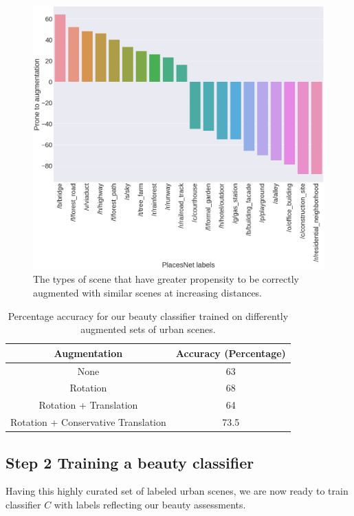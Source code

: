 \begin{figure}[t!]
    \centering
    \includegraphics[width=\columnwidth]{SimilarityPlacesPrevalence.png}
    \caption{The types of scene that have greater propensity to be correctly augmented with similar scenes at increasing distances.}
    \label{fig:augmentationSimilarity}
\end{figure}




\begin{table}[t!]
    \centering
    \begin{tabular}{|c|c|}
        \hline
        \textbf{Augmentation} & \textbf{Accuracy (Percentage)}\\
        \hline
        None & 63 \\
        \hline
        Rotation  & 68 \\
        \hline
        Rotation + Translation  & 64 \\
        \hline
        Rotation + Conservative Translation & 73.5 \\
        \hline
    \end{tabular}
    \caption{Percentage accuracy for our beauty classifier trained on differently augmented sets of  urban scenes.}
    \label{tab:classifier}
    \vspace{-10mm}
\end{table}


\subsection*{Step 2 Training a beauty classifier}
\label{Sec:Classifier}
Having this highly curated set of labeled urban scenes, we are now ready to train classifier $C$ with labels reflecting our beauty assessments. 

